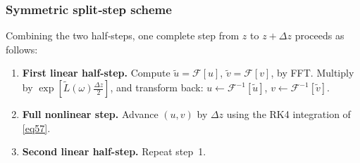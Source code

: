 \documentclass{article}
\begin{document}
            \subsubsection{Symmetric split‑step scheme}
                Combining the two half‑steps, one complete step from $z$ to $z+\Delta z$ proceeds as follows:
                \begin{enumerate}
                    \item \textbf{First linear half-step.} Compute $\tilde u = \mathcal{F}[u]$, $\tilde v = \mathcal{F}[v]$, by FFT.
                    Multiply by $\exp[\widetilde L(\omega)\frac{\Delta z}{2}]$, and transform back:
                    $u \leftarrow \mathcal{F}^{-1}[\tilde u]$, $v \leftarrow \mathcal{F}^{-1}[\tilde v]$.
                    \item \textbf{Full nonlinear step.} Advance $(u,v)$ by $\Delta z$ using the RK4 integration of \eqref{eq57}.
                    \item \textbf{Second linear half-step.} Repeat step~1.
                \end{enumerate}
\end{document}
